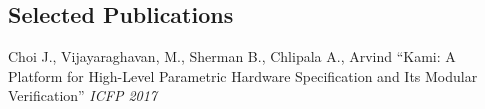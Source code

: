 \documentclass[margin,line]{resume}
\begin{document}
\begin{resume}
    \vspace{-5mm}


    \section{\mysidestyle Selected Publications}
    Choi J., {Vijayaraghavan, M.}, Sherman B., Chlipala A., Arvind ``Kami: A Platform for High-Level Parametric Hardware Specification and Its Modular Verification'' \textit{ICFP 2017}


\end{resume}
\end{document}
